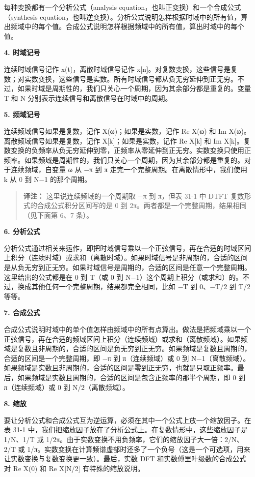 每种变换都有一个分析公式（analysis
equation，也叫正变换）和一个合成公式（synthesis
equation，也叫逆变换）。分析公式说明怎样根据时域中的所有值，算出频域中的每个值。合成公式说明怎样根据频域中的所有值，算出时域中的每个值。

\textbf{4. 时域记号}

连续时域信号记作 x(t)，离散时域信号记作
x{[}n{]}。对复数变换，这些信号是复数；对实数变换，这些信号是实数。所有时域信号都从负无穷延伸到正无穷。不过，如果时域是周期性的，我们只关心一个周期，因为其余部分都是重复的。变量
T 和 N 分别表示连续信号和离散信号在时域中的周期。

\textbf{5. 频域记号}

连续频域信号如果是复数，记作 X(ω)；如果是实数，记作 Re X(ω) 和 Im
X(ω)。离散频域信号如果是复数，记作 X{[}k{]}；如果是实数，记作 Re
X{[}k{]} 和 Im
X{[}k{]}。复数变换的负频率从负无穷延伸到零，正频率从零延伸到正无穷。实数变换只使用正频率。如果频域是周期性的，我们只关心一个周期，因为其余部分都是重复的。对于连续频域，自变量
ω 从 −π 到 π 走完一个完整周期。在离散情形中，我们使用 k 从 0 到 N−1
的那个周期。

\begin{quote}
\textbf{译注：} 这里说连续频域的一个周期取 −π 到 π，但表 31-1 中 DTFT
复数形式的合成公式积分区间写的是 0 到
2π。两者都是一个完整周期，结果相同（见下面第 6、7 条）。
\end{quote}

\textbf{6. 分析公式}

分析公式通过相关来运作，即把时域信号乘以一个正弦信号，再在合适的时域区间上积分（连续时域）或求和（离散时域）。如果时域信号是非周期的，合适的区间是从负无穷到正无穷。如果时域信号是周期的，合适的区间是任意一个完整周期。这里给出的公式都是在
0 到 T（或 0 到
N−1）这个周期上积分（或求和）的。不过，换成其他任何一个完整周期，结果都完全相同，比如
−T 到 0、−T/2 到 T/2 等等。

\textbf{7. 合成公式}

合成公式说明时域中的单个值怎样由频域中的所有点算出。做法是把频域乘以一个正弦信号，再在合适的频域区间上积分（连续频域）或求和（离散频域）。如果频域是复数且非周期的，合适的区间是负无穷到正无穷。如果频域是复数且周期的，合适的区间是一个完整周期，即
−π 到 π（连续频域）或 0 到
N−1（离散频域）。如果频域是实数且非周期的，合适的区间是零到正无穷，也就是只取正频率。最后，如果频域是实数且周期的，合适的区间是包含正频率的那半个周期，即
0 到 π（连续频域）或 0 到 N/2（离散频域）。

\textbf{8. 缩放}

要让分析公式和合成公式互为逆运算，必须在其中一个公式上放一个缩放因子。在表
31-1 中，我们把缩放因子放在了分析公式上。在复数情形中，这些缩放因子是
1/N、1/T 或 1/2π。由于实数变换不用负频率，它们的缩放因子大一倍：2/N、2/T
或
1/π。实数变换在计算频谱虚部时还多了一个负号（这是一个可选项，用来让实数变换与复数变换更一致）。最后，实数
DFT 和实数傅里叶级数的合成公式对 Re X(0) 和 Re X{[}N/2{]}
有特殊的缩放说明。

